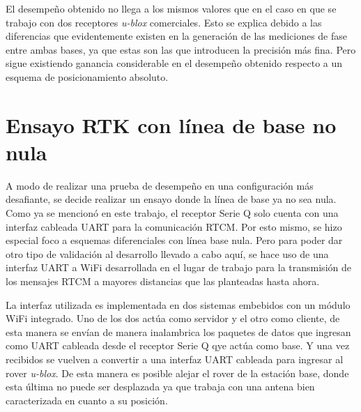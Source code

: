 \documentclass[a4paper,12pt,oneside,onecolumn,final,openright]{book}%
\begin{document}
	El desempeño obtenido no llega a los mismos valores que en el caso en que se trabajo con dos receptores \textit{u-blox} comerciales. Esto se explica debido a las diferencias que evidentemente existen en la generación de las mediciones de fase entre ambas bases, ya que estas son las que introducen la precisión más fina. Pero sigue existiendo ganancia considerable en el desempeño obtenido respecto a un esquema de posicionamiento absoluto.
\section{Ensayo RTK con línea de base no nula}
	A modo de realizar una prueba de desempeño en una configuración más desafiante, se decide realizar un ensayo donde la línea de base ya no sea nula. Como ya se mencionó en este trabajo, el receptor Serie Q solo cuenta con una interfaz cableada UART para la comunicación RTCM. Por esto mismo, se hizo especial foco a esquemas diferenciales con línea base nula. Pero para poder dar otro tipo de validación al desarrollo llevado a cabo aquí, se hace uso de una interfaz UART a WiFi desarrollada en el lugar de trabajo para la transmisión de los mensajes RTCM a mayores distancias que las planteadas hasta ahora.

	La interfaz utilizada es implementada en dos sistemas embebidos con un módulo WiFi integrado. Uno de los dos actúa como servidor y el otro como cliente, de esta manera se envían de manera inalambrica los paquetes de datos que ingresan como UART cableada desde el receptor Serie Q qye actúa como base. Y una vez recibidos se vuelven a convertir a una interfaz UART cableada para ingresar al rover \textit{u-blox}. De esta manera es posible alejar el rover de la estación base, donde esta última no puede ser desplazada ya que trabaja con una antena bien caracterizada en cuanto a su posición.
	
\end{document}

